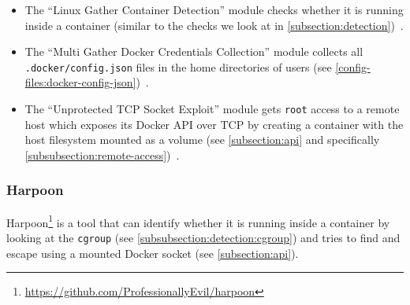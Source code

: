\begin{itemize}
    \item The ``Linux Gather Container Detection'' module checks whether it is running inside a container (similar to the checks we look at in \autoref{subsection:detection})~\cite{Metasploit-Linux-Gather-Container-Detection}.
    \item The ``Multi Gather Docker Credentials Collection'' module collects all \lstinline{.docker/config.json} files in the home directories of users (see \autoref{config-files:docker-config-json})~\cite{Docker-Credentials-Metasploit}.
    \item The ``Unprotected TCP Socket Exploit'' module gets \lstinline{root} access to a remote host which exposes its Docker API over TCP by creating a container with the host filesystem mounted as a volume (see \autoref{subsection:api} and specifically \autoref{subsubsection:remote-access})~\cite{Metasploit-Unprotected-TCP-Socket}.
\end{itemize}

\subsubsection{Harpoon}
Harpoon\footnote{\url{https://github.com/ProfessionallyEvil/harpoon}} is a tool that can identify whether it is running inside a container by looking at the \lstinline{cgroup} (see \autoref{subsubsection:detection:cgroup}) and tries to find and escape using a mounted Docker socket (see \autoref{subsection:api}).

